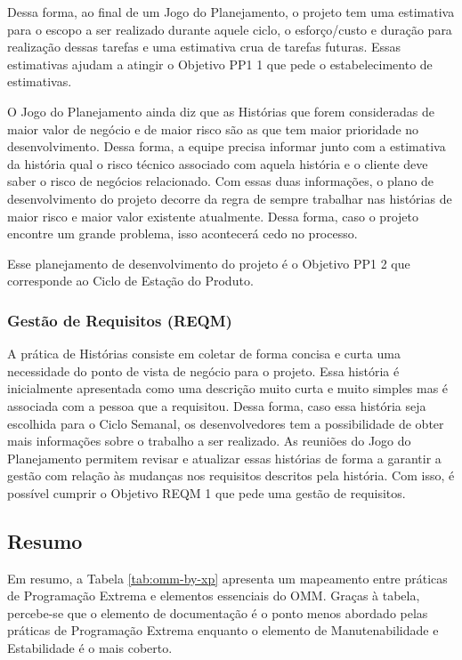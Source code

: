 Dessa forma, ao final de um Jogo do Planejamento, o projeto tem uma
estimativa para o escopo a ser realizado durante aquele ciclo, o
esforço/custo e duração para realização dessas tarefas e uma
estimativa crua de tarefas futuras. Essas estimativas ajudam a atingir
o Objetivo PP1 1 que pede o estabelecimento de estimativas.

O Jogo do Planejamento ainda diz que as Histórias que forem
consideradas de maior valor de negócio e de maior risco são as que tem
maior prioridade no desenvolvimento. Dessa forma, a equipe precisa
informar junto com a estimativa da história qual o risco técnico associado com
aquela história e o cliente deve saber o risco de negócios
relacionado. Com essas duas informações, o plano de desenvolvimento do
projeto decorre da regra de sempre trabalhar nas histórias de maior
risco e maior valor existente atualmente. Dessa forma, caso o projeto
encontre um grande problema, isso acontecerá cedo no processo.

Esse planejamento de desenvolvimento do projeto é o Objetivo PP1 2 que
corresponde ao Ciclo de Estação do Produto.

\subsubsection{Gestão de Requisitos (REQM)}
\label{sec:+reqm}

A prática de Histórias consiste em coletar de forma concisa e curta uma
necessidade do ponto de vista de negócio para o projeto. Essa história
é inicialmente apresentada como uma descrição muito curta e muito
simples mas é associada com a pessoa que a requisitou. Dessa forma,
caso essa história seja escolhida para o Ciclo Semanal, os
desenvolvedores tem a possibilidade de obter mais informações sobre o
trabalho a ser realizado. As reuniões do Jogo do Planejamento permitem
revisar e atualizar essas histórias de forma a garantir a gestão com
relação às mudanças nos requisitos descritos pela história. Com isso,
é possível cumprir o Objetivo REQM 1 que pede uma gestão de
requisitos.

\subsection{Resumo}
\label{sec:resumo-omm}

Em resumo, a Tabela \ref{tab:omm-by-xp} apresenta um mapeamento entre
práticas de Programação Extrema e elementos essenciais do OMM. Graças
à tabela, percebe-se que o elemento de documentação é o ponto menos
abordado pelas práticas de Programação Extrema enquanto o elemento de
Manutenabilidade e Estabilidade é o mais coberto.

